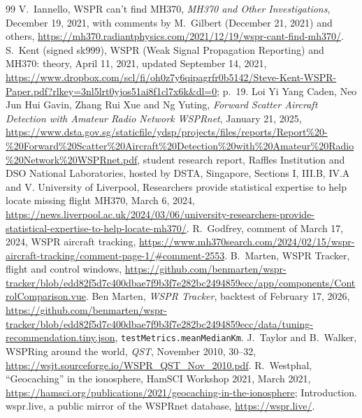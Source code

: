 \documentclass[11pt]{article}
\begin{document}
\begin{thebibliography}{99}
 V.~Iannello, WSPR can't find MH370, \emph{MH370 and Other Investigations}, December 19, 2021, with comments by M.~Gilbert (December 21, 2021) and others, \url{https://mh370.radiantphysics.com/2021/12/19/wspr-cant-find-mh370/}.
 S.~Kent (signed sk999), WSPR (Weak Signal Propagation Reporting) and MH370: theory, April 11, 2021, updated September 14, 2021, \url{https://www.dropbox.com/scl/fi/oh0z7y6qipagrfr0b5142/Steve-Kent-WSPR-Paper.pdf?rlkey=3nl5lrt0yjos51ai8f1cl7x6k&dl=0}; p.~19.
 Loi Yi Yang Caden, Neo Jun Hui Gavin, Zhang Rui Xue and Ng Yuting, \emph{Forward Scatter Aircraft Detection with Amateur Radio Network WSPRnet}, January 21, 2025, \url{https://www.dsta.gov.sg/staticfile/ydsp/projects/files/reports/Report%20-%20Forward%20Scatter%20Aircraft%20Detection%20with%20Amateur%20Radio%20Network%20WSPRnet.pdf}, student research report, Raffles Institution and DSO National Laboratories, hosted by DSTA, Singapore, Sections I, III.B, IV.A and V.
 University of Liverpool, Researchers provide statistical expertise to help locate missing flight MH370, March 6, 2024, \url{https://news.liverpool.ac.uk/2024/03/06/university-researchers-provide-statistical-expertise-to-help-locate-mh370/}.
 R.~Godfrey, comment of March 17, 2024, WSPR aircraft tracking, \url{https://www.mh370search.com/2024/02/15/wspr-aircraft-tracking/comment-page-1/#comment-2553}.
 B.~Marten, WSPR Tracker, flight and control windows, \url{https://github.com/benmarten/wspr-tracker/blob/edd82f5d7c400dbae7f9b3f7e282bc2494859ecc/app/components/ControlComparison.vue}.
 Ben Marten, \emph{WSPR Tracker}, backtest of February 17, 2026, \url{https://github.com/benmarten/wspr-tracker/blob/edd82f5d7c400dbae7f9b3f7e282bc2494859ecc/data/tuning-recommendation.tiny.json}, \texttt{testMetrics.meanMedianKm}.
 J.~Taylor and B.~Walker, WSPRing around the world, \emph{QST}, November 2010, 30--32, \url{https://wsjt.sourceforge.io/WSPR_QST_Nov_2010.pdf}.
 R.~Westphal, ``Geocaching'' in the ionosphere, HamSCI Workshop 2021, March 2021, \url{https://hamsci.org/publications/2021/geocaching-in-the-ionosphere}; Introduction.
 wspr.live, a public mirror of the WSPRnet database, \url{https://wspr.live/}.
\end{thebibliography}
\end{document}
